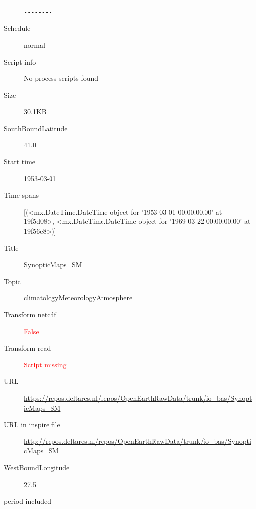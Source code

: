 \documentclass[9]{report}
\begin{document}
\begin{description}
\begin{verbatim}
------------------------------------------------------------------------

\end{verbatim}
  \item[Schedule] normal
  \item[Script info] No process scripts found
  \item[Size] 30.1KB
  \item[SouthBoundLatitude] 41.0
  \item[Start time] 1953-03-01
  \item[Time spans] [(<mx.DateTime.DateTime object for '1953-03-01 00:00:00.00' at 19f5d08>, <mx.DateTime.DateTime object for '1969-03-22 00:00:00.00' at 19f56e8>)]
  \item[Title]  SynopticMaps\_SM 
  \item[Topic] climatologyMeteorologyAtmosphere
  \item[Transform netcdf] \textcolor{red}{False}
  \item[Transform read] \textcolor{red}{Script missing}
  \item[URL] \href{https://repos.deltares.nl/repos/OpenEarthRawData/trunk/io\_bas/SynopticMaps\_SM}{https://repos.deltares.nl/repos/OpenEarthRawData/trunk/io\_bas/SynopticMaps\_SM}
  \item[URL in inspire file] \href{http://repos.deltares.nl/repos/OpenEarthRawData/trunk/io\_bas/SynopticMaps\_SM}{http://repos.deltares.nl/repos/OpenEarthRawData/trunk/io\_bas/SynopticMaps\_SM}
  \item[WestBoundLongitude] 27.5
  \item[period included] 
\end{description}
\end{document}
